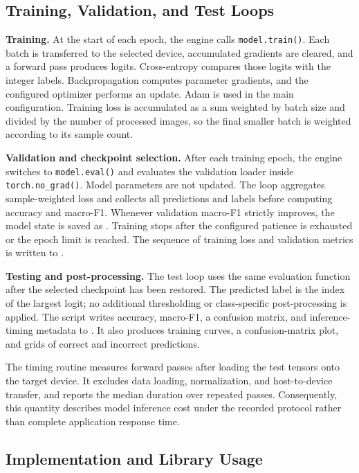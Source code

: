 \subsection{Training, Validation, and Test Loops}

\textbf{Training.} At the start of each epoch, the engine calls \texttt{model.train()}. Each batch is transferred to the selected device, accumulated gradients are cleared, and a forward pass produces logits. Cross-entropy compares those logits with the integer labels. Backpropagation computes parameter gradients, and the configured optimizer performs an update. Adam is used in the main configuration. Training loss is accumulated as a sum weighted by batch size and divided by the number of processed images, so the final smaller batch is weighted according to its sample count.

\textbf{Validation and checkpoint selection.} After each training epoch, the engine switches to \texttt{model.eval()} and evaluates the validation loader inside \texttt{torch.no\_grad()}. Model parameters are not updated. The loop aggregates sample-weighted loss and collects all predictions and labels before computing accuracy and macro-F1. Whenever validation macro-F1 strictly improves, the model state is saved as . Training stops after the configured patience is exhausted or the epoch limit is reached. The sequence of training loss and validation metrics is written to .

\textbf{Testing and post-processing.} The test loop uses the same evaluation function after the selected checkpoint has been restored. The predicted label is the index of the largest logit; no additional thresholding or class-specific post-processing is applied. The script writes accuracy, macro-F1, a confusion matrix, and inference-timing metadata to . It also produces training curves, a confusion-matrix plot, and grids of correct and incorrect predictions.

The timing routine measures forward passes after loading the test tensors onto the target device. It excludes data loading, normalization, and host-to-device transfer, and reports the median duration over repeated passes. Consequently, this quantity describes model inference cost under the recorded protocol rather than complete application response time.

\subsection{Implementation and Library Usage}

